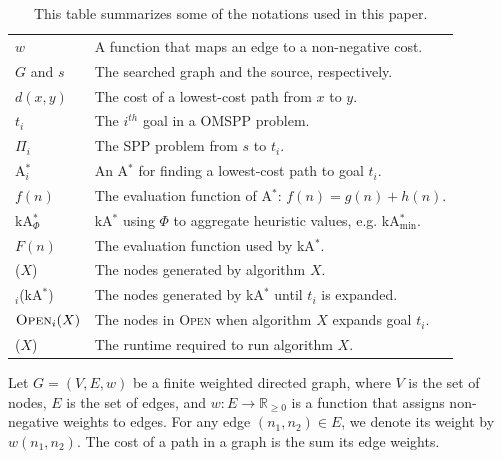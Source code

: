 \documentclass[smallextended]{svjour3}       %
\newcommand{\omspp}{\ac{OMSPP}\xspace}
\newcommand{\spp}{\ac{SPP}\xspace}
\newcommand{\astar}{A$^*$\xspace}
\newcommand{\kastar}{kA$^*$\xspace}
\newcommand{\kastarvar}[1]{\textup{kA}$^*_{#1}$\xspace}
\newcommand{\kastarmin}{\kastarvar{\min}}
\newcommand{\kastarphi}{\textup{kA}$^*_{\Phi}$\xspace}
\newcommand{\astari}[1]{A$^*_{#1}$\xspace}
\newcommand{\Gen}{\text{Gen}}
\newcommand{\Exp}{\text{Exp}}
\newcommand{\Time}{\text{Time}}
\newcommand{\minf}{$F_{min}(n)$\xspace}
\newcommand{\open}{\textsc{Open}\xspace}
\newcommand{\nonnegreals}{\mathbb{R}_{\geq 0}}
\newcommand{\abda}[1]{\textbf{[AS:#1]}}
\begin{document}
\begin{table}
  \centering
  \footnotesize
  \begin{tabular}{|l|m{78mm}|}
    \hline
    $w$         & A function that maps an edge to a non-negative cost.  \\
    $G$ and $s$ & The searched graph and the source, respectively. \\
    $d(x, y)$   & The cost of a lowest-cost path from $x$ to $y$. \\
    $t_i$       & The $i^{th}$ goal in a \omspp problem. \\
    $\Pi_i$     & The \spp problem from $s$ to $t_i$. \\
    \astari{i}  & An \astar for finding a lowest-cost path to goal $t_i$. \\
    $f(n)$      & The evaluation function of \astar: $f(n)=g(n)+h(n)$. \\
    \kastarphi  & \kastar using $\Phi$ to aggregate heuristic values, e.g. \kastarmin.\\
    $F(n)$      & The evaluation function used by \kastar. \\
    \Gen($X$)    & The nodes generated by algorithm $X$. \\
    \Gen$_i$(\kastar) & The nodes generated by \kastar until $t_i$ is expanded. \\
    $\open_i(X)$ & The nodes in \open when algorithm $X$ expands goal $t_i$.\\
    \Time($X$)   & The runtime required to run algorithm $X$. \\
    \hline
  \end{tabular}
  \caption{This table summarizes some of the notations used in this paper.}
  \label{tab:notations}
\end{table}


Let $G = (V, E, w)$ be a finite weighted directed graph, where $V$ is the set of nodes, $E$ is the set of edges, and $w:E\rightarrow \nonnegreals$ is a function that assigns non-negative weights to edges. 
For any edge $(n_1,n_2)\in E$, we denote its weight by $w(n_1, n_2)$. The cost of a path in a graph is the sum its edge weights. %
\end{document}
